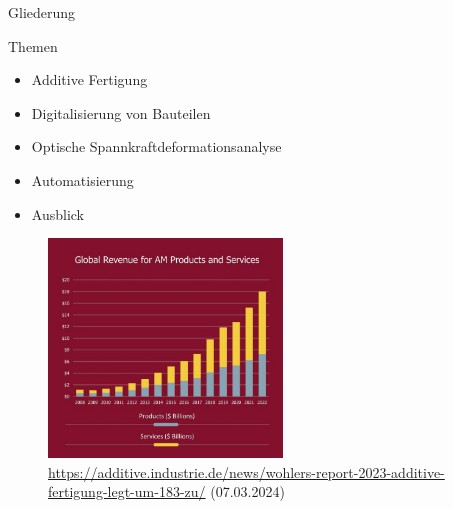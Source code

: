 \documentclass[../slides.tex]{subfiles}
\begin{document}
\begin{frame}{Gliederung}
  \begin{minipage}[]{.49\textwidth}
    \begin{block}{Themen}
      \begin{itemize}
          \item Additive Fertigung
          \item Digitalisierung von Bauteilen
          \item Optische Spannkraftdeformationsanalyse
          \item Automatisierung 
          \item Ausblick
      \end{itemize}
    \end{block}
  \end{minipage}
  \hfill
  \begin{minipage}[]{.49\textwidth}
    \begin{figure}[]
      \includegraphics[height=165pt]{img_niklas/Picture3-1-scaled_0FB63A00-D319-40EF-A648-9739A68215D6.jpg}
      \caption{\tiny{\url{https://additive.industrie.de/news/wohlers-report-2023-additive-fertigung-legt-um-183-zu/} (07.03.2024)\\}}
      \label{fig:globalRev}
    \end{figure}
  \end{minipage}
\end{frame}
\end{document}

